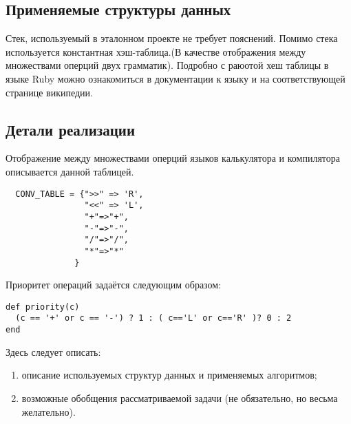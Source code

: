 \subsection{Применяемые структуры данных}
Стек, используемый в эталонном проекте не требует пояснений.
Помимо стека используется константная хэш-таблица.(В качестве отображения
между множествами оперций двух грамматик). Подробно с раюотой хеш таблицы в языке
Ruby можно ознакомиться в документации к языку и на соответствующей странице
википедии.
\subsection{Детали реализации}
Отображение между множествами оперций языков калькулятора и компилятора описывается
данной таблицей.
\begin{lstlisting}
  CONV_TABLE = {">>" => 'R',
                "<<" => 'L',
                "+"=>"+",
                "-"=>"-",
                "/"=>"/",
                "*"=>"*"
              }
\end{lstlisting}

Приоритет операций задаётся следующим образом:
\begin{lstlisting}
def priority(c)
  (c == '+' or c == '-') ? 1 : ( c=='L' or c=='R' )? 0 : 2
end
\end{lstlisting}


Здесь следует описать:
\begin{enumerate}[1]
\item описание используемых структур данных и применяемых алгоритмов;
\item возможные обобщения рассматриваемой задачи (не обязательно, но
      весьма желательно).
\end{enumerate}
